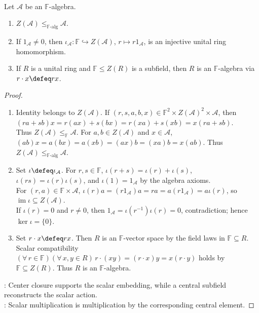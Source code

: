 \begin{proposition} \label{prop:field-embeds-in-center-of-algebra} \\
Let $\mathcal{A}$ be an $\mathbb{F}$-algebra.
\begin{enumerate}[label=(\roman*)]
\setlength{\itemsep}{0pt}
\item $Z(\mathcal{A})\leq_{\mathbb{F}\text{-alg}}\mathcal{A}$.
\item If $1_{\mathcal{A}}\neq0$, then $\iota_{\mathcal{A}}:\mathbb{F}\hookrightarrow Z(\mathcal{A})$, $r\mapsto r1_{\mathcal{A}}$, is an injective unital ring homomorphism.
\item If $R$ is a unital ring and $\mathbb{F}\leq Z(R)$ is a subfield, then $R$ is an $\mathbb{F}$-algebra via $r\cdot x\defeq rx$.
\end{enumerate}
\begin{proof}
\begin{enumerate}[label=(\roman*)]
\setlength{\itemsep}{0pt}
\item Identity belongs to $Z(\mathcal{A})$. If $(r,s,a,b,x)\in\mathbb{F}^2\times Z(\mathcal{A})^2\times\mathcal{A}$, then $(ra+sb)x=r(ax)+s(bx)=r(xa)+s(xb)=x(ra+sb)$.\\
Thus $Z(\mathcal{A})\leq_{\mathbb{F}}\mathcal{A}$. For $a,b\in Z(\mathcal{A})$ and $x\in\mathcal{A}$, $(ab)x=a(bx)=a(xb)=(ax)b=(xa)b=x(ab)$. Thus $Z(\mathcal{A})\leq_{\mathbb{F}\text{-alg}}\mathcal{A}$.
\item Set $\iota\defeq\iota_{\mathcal{A}}$. For $r,s\in\mathbb{F}$, $\iota(r+s)=\iota(r)+\iota(s)$, $\iota(rs)=\iota(r)\iota(s)$, and $\iota(1)=1_{\mathcal{A}}$ by the algebra axioms.\\
For $(r,a)\in\mathbb{F}\times\mathcal{A}$, $\iota(r)a=(r1_{\mathcal{A}})a=ra=a(r1_{\mathcal{A}})=a\iota(r)$, so $\operatorname{im}\iota\subseteq Z(\mathcal{A})$.\\
If $\iota(r)=0$ and $r\neq0$, then $1_{\mathcal{A}}=\iota(r^{-1})\iota(r)=0$, contradiction; hence $\ker\iota=\{0\}$.
\item Set $r\cdot x\defeq rx$. Then $R$ is an $\mathbb{F}$-vector space by the field laws in $\mathbb{F}\subseteq R$.\\
Scalar compatibility $(\forall\,r\in\mathbb{F})(\forall\,x,y\in R)\,r\cdot(xy)=(r\cdot x)y=x(r\cdot y)$ holds by $\mathbb{F}\subseteq Z(R)$. Thus $R$ is an $\mathbb{F}$-algebra.
\end{enumerate}
: Center closure supports the scalar embedding, while a central subfield reconstructs the scalar action.\\
: Scalar multiplication is multiplication by the corresponding central element.
\end{proof}
\end{proposition}

